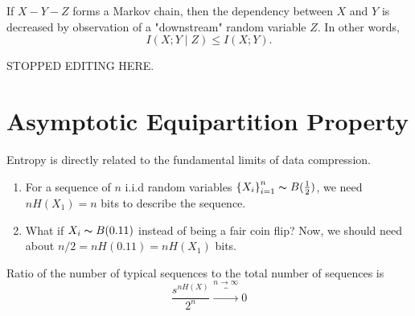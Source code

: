 \begin{cor}{}{}
    If \(X - Y - Z\) forms a Markov chain, then the dependency between \(X\) and \(Y\) is decreased by observation of a "downstream" random variable \(Z\). In other words,
    \[
        I(X;Y\mid Z) \leq I(X;Y). 
    \]

\end{cor}

STOPPED EDITING HERE.

\section{Asymptotic Equipartition Property}

Entropy is directly related to the fundamental limits of data compression. 

\begin{enumerate}
    \item For a sequence of \(n\) i.i.d random variables \(\left\{ X_{i}  \right\}_{i = 1}^n \thicksim  B(\frac{1}{2})\), we need \(nH(X_1) = n\) bits to describe the sequence. 
    \item What if \( X _{i} \thicksim B(0.11)\) instead of being a fair coin flip? Now, we should need about \(n / 2 = nH(0.11) = nH(X_1)\)  bits. 
\end{enumerate}

Ratio of the number of typical sequences to the total number of sequences is 
\[
    \frac{s^{nH(X)} }{2^n} \overbrace{\to}^{n \to  \infty } 0 
\]